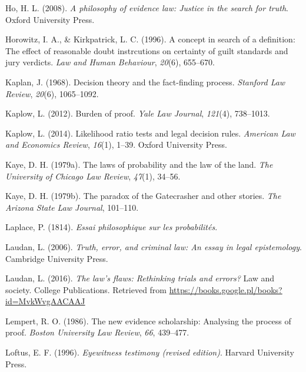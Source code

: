 \documentclass[10pt,dvipsnames,enabledeprecatedfontcommands]{scrartcl}
\begin{document}
\leavevmode\hypertarget{ref-ho2008philosophy}{}%
Ho, H. L. (2008). \emph{A philosophy of evidence law: Justice in the
search for truth}. Oxford University Press.

\leavevmode\hypertarget{ref-Horowitz1996}{}%
Horowitz, I. A., \& Kirkpatrick, L. C. (1996). A concept in search of a
definition: The effect of reasonable doubt instrcutions on certainty of
guilt standards and jury verdicts. \emph{Law and Human Behaviour},
\emph{20}(6), 655--670.

\leavevmode\hypertarget{ref-Kaplan1968decision}{}%
Kaplan, J. (1968). Decision theory and the fact-finding process.
\emph{Stanford Law Review}, \emph{20}(6), 1065--1092.

\leavevmode\hypertarget{ref-kaplow2012}{}%
Kaplow, L. (2012). Burden of proof. \emph{Yale Law Journal},
\emph{121}(4), 738--1013.

\leavevmode\hypertarget{ref-kaplow2014likelihood}{}%
Kaplow, L. (2014). Likelihood ratio tests and legal decision rules.
\emph{American Law and Economics Review}, \emph{16}(1), 1--39. Oxford
University Press.

\leavevmode\hypertarget{ref-kaye79}{}%
Kaye, D. H. (1979a). The laws of probability and the law of the land.
\emph{The University of Chicago Law Review}, \emph{47}(1), 34--56.

\leavevmode\hypertarget{ref-Kaye79gate}{}%
Kaye, D. H. (1979b). The paradox of the Gatecrasher and other stories.
\emph{The Arizona State Law Journal}, 101--110.

\leavevmode\hypertarget{ref-Laplace1814}{}%
Laplace, P. (1814). \emph{Essai philosophique sur les probabilités}.

\leavevmode\hypertarget{ref-laudan2006truth}{}%
Laudan, L. (2006). \emph{Truth, error, and criminal law: An essay in
legal epistemology}. Cambridge University Press.

\leavevmode\hypertarget{ref-laudan2016law}{}%
Laudan, L. (2016). \emph{The law's flaws: Rethinking trials and errors?}
Law and society. College Publications. Retrieved from
\url{https://books.google.pl/books?id=MvkWvgAACAAJ}

\leavevmode\hypertarget{ref-Lempert1986}{}%
Lempert, R. O. (1986). The new evidence scholarship: Analysing the
process of proof. \emph{Boston University Law Review}, \emph{66},
439--477.

\leavevmode\hypertarget{ref-Loftus1996}{}%
Loftus, E. F. (1996). \emph{Eyewitness testimony (revised edition)}.
Harvard University Press.
\end{document}

